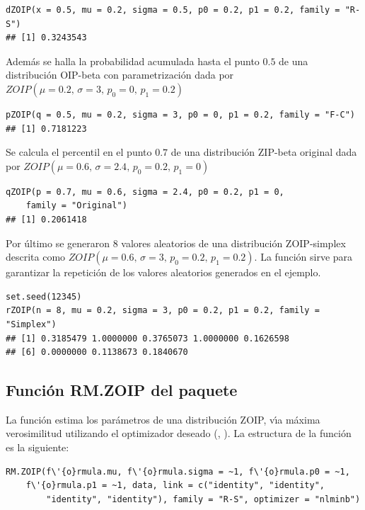 \begin{verbatim}
dZOIP(x = 0.5, mu = 0.2, sigma = 0.5, p0 = 0.2, p1 = 0.2, family = "R-S")
## [1] 0.3243543
\end{verbatim}

Adem\'{a}s se halla la probabilidad acumulada hasta el punto $0.5$ de una distribuci\'{o}n OIP-beta con parametrizaci\'{o}n \cite{Ferrari2} dada por $ZOIP(\mu=0.2, \, \sigma=3, \, p_0=0, \, p_1=0.2)$\\

\begin{verbatim}
pZOIP(q = 0.5, mu = 0.2, sigma = 3, p0 = 0, p1 = 0.2, family = "F-C")
## [1] 0.7181223
\end{verbatim}

Se calcula el percentil en el punto $0.7$ de una distribuci\'{o}n ZIP-beta original dada por $ZOIP(\mu=0.6, \, \sigma=2.4, \, p_0=0.2, \, p_1=0)$\\

\begin{verbatim}
qZOIP(p = 0.7, mu = 0.6, sigma = 2.4, p0 = 0.2, p1 = 0, 
    family = "Original")
## [1] 0.2061418
\end{verbatim}

Por \'{u}ltimo se generaron 8 valores aleatorios de una distribuci\'{o}n ZOIP-simplex descrita como $ZOIP(\mu=0.6, \, \sigma=3, \, p_0=0.2, \, p_1=0.2)$. La funci\'{o}n  sirve para garantizar la repetici\'{o}n de los valores aleatorios generados en el ejemplo.\\

\begin{verbatim}
set.seed(12345)
rZOIP(n = 8, mu = 0.2, sigma = 3, p0 = 0.2, p1 = 0.2, family = "Simplex")
## [1] 0.3185479 1.0000000 0.3765073 1.0000000 0.1626598
## [6] 0.0000000 0.1138673 0.1840670
\end{verbatim}

\subsection{Funci\'{o}n RM.ZOIP del paquete }

La funci\'{o}n  estima los par\'{a}metros de una distribuci\'{o}n ZOIP, v\'{\i}a m\'{a}xima verosimilitud utilizando el optimizador deseado (, ). La estructura de la funci\'{o}n  es la siguiente:

\begin{verbatim}
RM.ZOIP(f\'{o}rmula.mu, f\'{o}rmula.sigma = ~1, f\'{o}rmula.p0 = ~1, 
    f\'{o}rmula.p1 = ~1, data, link = c("identity", "identity", 
        "identity", "identity"), family = "R-S", optimizer = "nlminb")
\end{verbatim}

